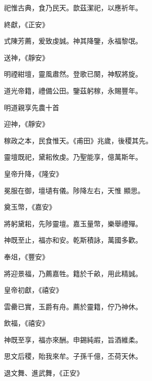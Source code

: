 \begin{pinyinscope}
 祀惟古典，食乃民天。歆茲潔祀，以應祈年。



 終獻，《正安》



 式陳芳薦，爰致虔誠。神其降鑒，永福黎氓。



 送神，《靜安》



 明禋紺壇，靈風肅然。登歌已闋，神馭將旋。



 道光帝籍，禮備公田。鑒茲躬稼，永賜豐年。



 明道親享先農十首



 迎神，《靜安》



 稼政之本，民食惟天。《甫田》兆歲，後稷其先。



 靈壇既祀，黛耜攸虔。乃聖能享，億萬斯年。



 皇帝升降，《隆安》



 冕服在御，壇壝有儀。陟降左右，天惟
 顯思。



 奠玉幣，《嘉安》



 將躬黛耜，先陟靈壇。嘉玉量幣，樂舉禮殫。



 神既至止，福亦和安。乾斯積詠，萬國多歡。



 奉俎，《豐安》



 將迎景福，乃薦嘉牲。籍於千畝，用此精誠。



 皇帝初獻，《禧安》



 雲罍已實，玉爵有舟。薦於靈籍，佇乃神休。



 飲福，《禧安》



 神既至享，福亦來酬。申錫純嘏，旨酒維柔。



 思文后稷，貽我來牟。子孫千億，丕荷天休。



 退文舞、進武舞，《正安》




\end{pinyinscope}
